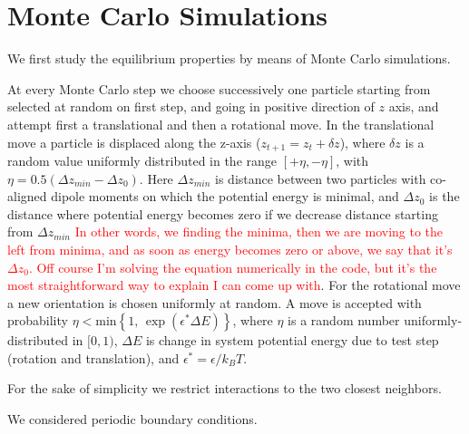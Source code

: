 \section{Monte Carlo Simulations}

We first study the equilibrium properties by means of Monte Carlo simulations.

At every Monte Carlo step we choose successively one particle starting from selected at random on first step, and going in positive direction of $z$ axis, and attempt first a translational and then a rotational move. In the translational move a particle is displaced along the z-axis ($z_{t+1} = z_t + \delta z$), where $\delta z$ is a random value uniformly distributed in the range $[+\eta, -\eta]$, with $\eta = 0.5 (\Delta z_{min} - \Delta z_0)$. Here $\Delta z_{min}$ is distance between two particles with co-aligned dipole moments on which the potential energy is minimal, and $\Delta z_0$ is the distance where potential energy becomes zero if we decrease distance starting from $\Delta z_{min}$ \textcolor{red}{In other words, we finding the minima, then we are moving to the left from minima, and as soon as energy becomes zero or above, we say that it's $\Delta z_0$. Off course I'm solving the equation numerically in the code, but it's the most straightforward way to explain I can come up with}. For the rotational move a new orientation is chosen uniformly at random. A move is accepted with probability $\eta < \mathrm{min} \left\{1, \, \exp(\epsilon^*\Delta E) \right\}$, where $\eta$ is a random number uniformly-distributed in $[0, 1)$, $\Delta E$ is change in system potential energy due to test step (rotation and translation), and $\epsilon^* = \epsilon/k_B T$.

For the sake of simplicity we restrict interactions to the two closest neighbors.

We considered periodic boundary conditions.